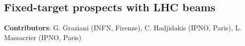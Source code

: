 \documentclass[../report.tex]{subfiles}
\providecommand{\main}{..}
\begin{document}








\subsection{Fixed-target prospects with LHC beams}
\label{sec:fixedtarget}

\textbf{Contributors}: G. Graziani (INFN, Firenze), C. Hadjidakis (IPNO, Paris), L. Massacrier (IPNO, Paris)
\end{document}
